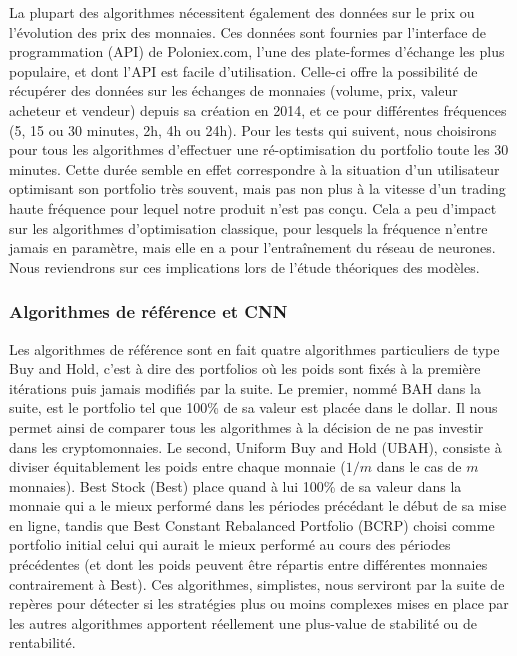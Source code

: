 \documentclass[a4paper, 10pt]{article}
\begin{document}
La plupart des algorithmes nécessitent également des données sur le prix ou l'évolution des prix des monnaies. Ces données sont fournies par l'interface de programmation (API) de Poloniex.com, l'une des plate-formes d'échange les plus populaire, et dont l'API est facile d'utilisation. Celle-ci offre la possibilité de récupérer des données sur les échanges de monnaies (volume, prix, valeur acheteur et vendeur) depuis sa création en 2014, et ce pour différentes fréquences (5, 15 ou 30 minutes, 2h, 4h ou 24h). Pour les tests qui suivent, nous choisirons pour tous les algorithmes d'effectuer une ré-optimisation du portfolio toute les 30 minutes. Cette durée semble en effet correspondre à la situation d'un utilisateur optimisant son portfolio très souvent, mais pas non plus à la vitesse d'un trading haute fréquence pour lequel notre produit n'est pas conçu. Cela a peu d'impact sur les algorithmes d'optimisation classique, pour lesquels la fréquence n'entre jamais en paramètre, mais elle en a pour l'entraînement du réseau de neurones. Nous reviendrons sur ces implications lors de l'étude théoriques des modèles.

\subsubsection{Algorithmes de référence et CNN}
\label{sec:theorie_implem_algo}

Les algorithmes de référence sont en fait quatre algorithmes particuliers de type Buy and Hold, c'est à dire des portfolios où les poids sont fixés à la première itérations puis jamais modifiés par la suite. Le premier, nommé BAH dans la suite, est le portfolio tel que 100\% de sa valeur est placée dans le dollar. Il nous permet ainsi de comparer tous les algorithmes à la décision de ne pas investir dans les cryptomonnaies. Le second, Uniform Buy and Hold (UBAH), consiste à diviser équitablement les poids entre chaque monnaie ($1/m$ dans le cas de $m$ monnaies). Best Stock (Best) place quand à lui 100\% de sa valeur dans la monnaie qui a le mieux performé dans les périodes précédant le début de sa mise en ligne, tandis que Best Constant Rebalanced Portfolio (BCRP) choisi comme portfolio initial celui qui aurait le mieux performé au cours des périodes précédentes (et dont les poids peuvent être répartis entre différentes monnaies contrairement à Best). Ces algorithmes, simplistes, nous serviront par la suite de repères pour détecter si les stratégies plus ou moins complexes mises en place par les autres algorithmes apportent réellement une plus-value de stabilité ou de rentabilité.
\end{document}
